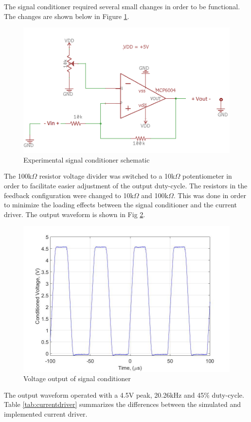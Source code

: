 
	
The signal conditioner required several small changes in order to be functional. The changes are shown below in Figure \ref{fig:signalconditionerexperimentalschem}.


\begin{figure}
	\centering
	\includegraphics[width=0.6\linewidth]{ExperimentalImplementation/SignalConditionerExperimentalSchem}
	\caption{Experimental signal conditioner schematic}
	\label{fig:signalconditionerexperimentalschem}
\end{figure}

 The 100k$\Omega$ resistor voltage divider was switched to a 10k$\Omega$ potentiometer in order to facilitate easier adjustment of the output duty-cycle. The resistors in the feedback configuration were changed to 10k$\Omega$ and 100k$\Omega$. This was done in order to minimize the loading effects between the signal conditioner and the current driver. The output waveform is shown in Fig \ref{fig:conditionedvoltagelab4}.

\begin{figure}[H]
	\centering
	\includegraphics[width=0.6\linewidth]{ExperimentalImplementation/conditioned_voltage_lab4}
	\caption[Experimental signal conditioner]{Voltage output of signal conditioner}
	\label{fig:conditionedvoltagelab4}
\end{figure}

The output waveform operated with a 4.5V peak, 20.26kHz and 45\% duty-cycle. Table \ref{tab:currentdriver} summarizes the differences between the simulated and implemented current driver.  



